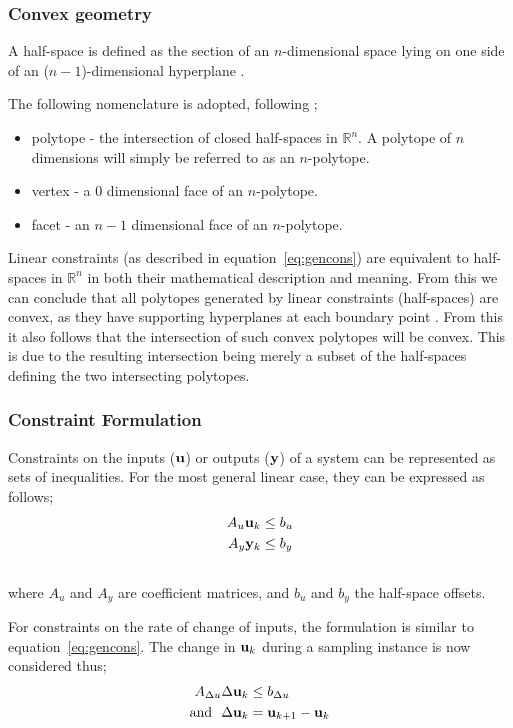 \documentclass[final,authoryear,5pt,times,twocolumn]{elsarticle}
\newcommand{\vect}[1] %
{{\bf {#1}}}
\newcommand{\npoly}{$n$-polytope}
\begin{document}
\subsubsection{Convex geometry}
A half-space is defined as the section of an $n$-dimensional space lying on one side of an ($n-1$)-dimensional hyperplane \citep[1282]{crcmaths}.

The following nomenclature is adopted, following \citet[487]{bayerlee};
\begin{itemize}
\item polytope - the intersection of closed half-spaces in $\mathbb{R}^n$.
A polytope of $n$ dimensions will simply be referred to as an $n$-polytope.
\item vertex - a 0 dimensional face of an \npoly.
\item facet - an $n-1$ dimensional face of an \npoly.
\end{itemize}

Linear constraints (as described in equation~\ref{eq:gencons}) are equivalent to half-spaces in $\mathbb{R}^n$ in both their mathematical description and meaning.
From this we can conclude that all polytopes generated by linear constraints (half-spaces) are convex, as they have supporting hyperplanes at each boundary point \citep[21]{manilev}.
From this it also follows that the intersection of such convex polytopes will be convex.
This is due to the resulting intersection being merely a subset of the half-spaces defining the two intersecting polytopes.

\subsubsection{Constraint Formulation}
Constraints on the inputs ($\vect{u}$) or outputs ($\vect{y}$) of a system can be represented as sets of inequalities.
For the most general linear case, they can be expressed as follows;
\begin{align}
  \label{eq:gencons}
  A_u\vect{u}_k &\leq b_u \\ \notag
  A_y\vect{y}_k &\leq b_y \\ \notag
\end{align}
where $A_u$ and $A_y$ are coefficient matrices, and $b_u$ and $b_y$  the half-space offsets.

For constraints on the rate of change of inputs, the formulation is similar to equation~\ref{eq:gencons}.
The change in $\vect{u}_k$ during a sampling instance is now considered thus;
\begin{align*}
  A_{\Delta u}\Delta \vect{u}_k &\leq b_{\Delta u} \notag \\
  \text{and}~~ \Delta \vect{u}_k &= \vect{u}_{k+1}-\vect{u}_k
\end{align*}
\end{document}
